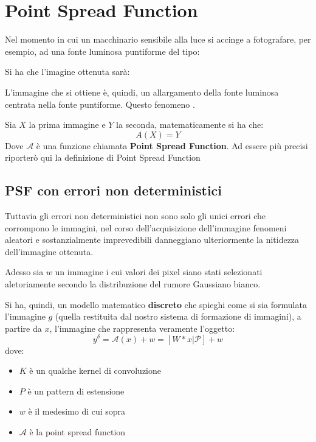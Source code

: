 \section{Point Spread Function}
Nel momento in cui un macchinario sensibile alla luce si accinge a fotografare, per esempio, ad una fonte luminosa puntiforme del tipo:

Si ha che l'imagine ottenuta sarà:

L'immagine che si ottiene è, quindi, un allargamento della fonte luminosa centrata nella fonte puntiforme. Questo fenomeno . 

Sia $X$ la prima immagine e $Y$ la seconda, matematicamente si ha che:
\[
    A(X) = Y    
\]
Dove $\mathcal{A}$ è una funzione chiamata \textbf{Point Spread Function}. Ad essere più precisi riporterò qui la definizione di Point Spread Function

\subsection{PSF con errori non deterministici}
Tuttavia gli errori non deterministici non sono solo gli unici errori che corrompono le immagini, nel corso dell’acquisizione dell’immagine fenomeni aleatori e sostanzialmente imprevedibili danneggiano ulteriormente la nitidezza dell’immagine ottenuta.

Adesso sia $w$ un immagine i cui valori dei pixel siano stati selezionati aletoriamente secondo la distribuzione del rumore Gaussiano bianco. 

Si ha, quindi, un modello matematico \textbf{discreto} che spieghi come si sia formulata l'immagine $g$ (quella restituita dal nostro sistema di formazione di immagini), a partire da $x$, l'immagine che rappresenta veramente l'oggetto:
\[
    y^\delta = \mathcal{A}(x) + w =  [W*x|\mathcal{P}] + w  
\]
dove: 
\begin{itemize}
    \item $K$ è un qualche kernel di convoluzione
    \item $P$ è un pattern di estensione 
    \item $w$ è il medesimo di cui sopra
    \item $\mathcal{A}$ è la point spread function
\end{itemize}

